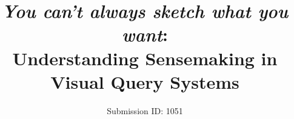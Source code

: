 \documentclass{egpubl}
\begin{document}
\title{\emph{You can't always sketch what you want}: \\ Understanding Sensemaking in Visual Query Systems\vspace{-20pt}}
\author{Submission ID: 1051\vspace{-50pt}}
\maketitle
\end{document}
